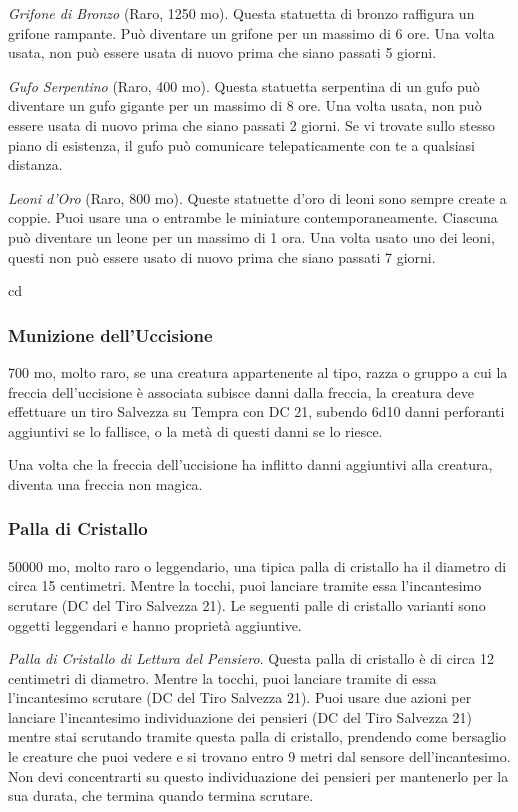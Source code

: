 \begin{multicols}{2}
\textit{Grifone di Bronzo} (Raro, 1250 mo). Questa statuetta di bronzo raffigura un grifone rampante. Può diventare un grifone per un massimo di 6 ore. Una volta usata, non può essere usata di nuovo prima che siano passati 5 giorni.

\textit{Gufo Serpentino} (Raro, 400 mo). Questa statuetta serpentina di un gufo può diventare un gufo gigante per un massimo di 8 ore. Una volta usata, non può essere usata di nuovo prima che siano passati 2 giorni. Se vi trovate sullo stesso piano di esistenza, il gufo può comunicare telepaticamente con te a qualsiasi distanza.

\textit{Leoni d'Oro} (Raro, 800 mo). Queste statuette d'oro di leoni sono sempre create a coppie. Puoi usare una o entrambe le miniature contemporaneamente. Ciascuna può diventare un leone per un massimo di 1 ora. Una volta usato uno dei leoni, questi non può essere usato di nuovo prima che siano passati 7 giorni.

cd \subsubsection*{Munizione dell'Uccisione}
700 mo, molto raro, se una creatura appartenente al tipo, razza o gruppo a cui la freccia dell'uccisione è associata subisce danni dalla freccia, la creatura deve effettuare un tiro Salvezza su Tempra con DC 21, subendo 6d10 danni perforanti aggiuntivi se lo fallisce, o la metà di questi danni se lo riesce.

Una volta che la freccia dell'uccisione ha inflitto danni aggiuntivi alla creatura, diventa una freccia non magica.

\subsubsection*{Palla di Cristallo}
50000 mo, molto raro o leggendario, una tipica palla di cristallo ha il diametro di circa 15 centimetri. Mentre la tocchi, puoi lanciare tramite essa l'incantesimo scrutare (DC del Tiro Salvezza 21). Le seguenti palle di cristallo varianti sono oggetti leggendari e hanno proprietà aggiuntive.

\textit{Palla di Cristallo di Lettura del Pensiero}. Questa palla di cristallo è di circa 12 centimetri di diametro. Mentre la tocchi, puoi lanciare tramite di essa l'incantesimo scrutare (DC del Tiro Salvezza 21). Puoi usare due azioni per lanciare l'incantesimo individuazione dei pensieri (DC del Tiro Salvezza 21) mentre stai scrutando tramite questa palla di cristallo, prendendo come bersaglio le creature che puoi vedere e si trovano entro 9 metri dal sensore dell'incantesimo. Non devi concentrarti su questo individuazione dei pensieri per mantenerlo per la sua durata, che termina quando termina scrutare.


\end{multicols}
